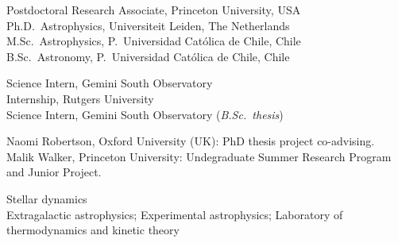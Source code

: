 \documentclass[11pt]{article}
\begin{document}

\noindent
{} Postdoctoral Research Associate, Princeton University, USA\\
 Ph.D.~Astrophysics, Universiteit Leiden, The Netherlands\\
 M.Sc.~Astrophysics, P.~Universidad Cat\'olica de Chile, Chile\\
 B.Sc.~Astronomy, P.~Universidad Cat\'olica de Chile, Chile



\noindent
{} Science Intern, Gemini South Observatory\\
 Internship, Rutgers University\\
 Science Intern, Gemini South Observatory (\emph{B.Sc.\ thesis})\\




\noindent
{} Naomi Robertson, Oxford University (UK): PhD thesis project co-advising.\\
 Malik Walker, Princeton University: Undegraduate Summer Research Program and Junior Project.


\noindent
{} Stellar dynamics\\
 Extragalactic astrophysics; Experimental astrophysics; Laboratory of thermodynamics and kinetic theory\\


\pagebreak


\end{document}
